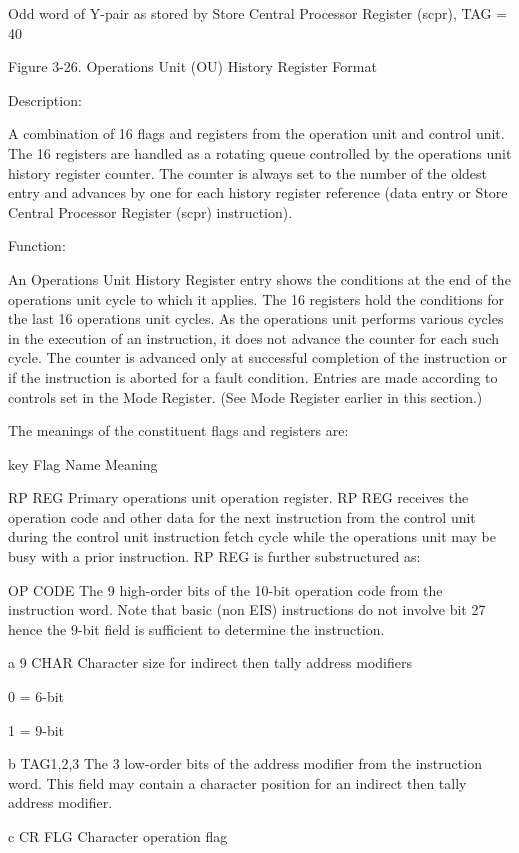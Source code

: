 Odd word of Y-pair as stored by Store Central Processor Register (scpr), TAG = 40

Figure 3-26. Operations Unit (OU) History Register Format

Description:

A combination of 16 flags and registers from the operation unit and control
unit. The 16 registers are handled as a rotating queue controlled by the
operations unit history register counter. The counter is always set to the
number of the oldest entry and advances by one for each history register
reference (data entry or Store Central Processor Register (scpr) instruction).

Function:

An Operations Unit History Register entry shows the conditions at the end of
the operations unit cycle to which it applies. The 16 registers hold the
conditions for the last 16 operations unit cycles. As the operations unit
performs various cycles in the execution of an instruction, it does not advance
the counter for each such cycle. The counter is advanced only at successful
completion of the instruction or if the instruction is aborted for a fault
condition. Entries are made according to controls set in the Mode Register.
(See Mode Register earlier in this section.)

The meanings of the constituent flags and registers are:

key Flag Name Meaning

RP REG Primary operations unit operation register. RP REG receives the
operation code and other data for the next instruction from the control unit
during the control unit instruction fetch cycle while the operations unit may
be busy with a prior instruction.  RP REG is further substructured as:

OP CODE The 9 high-order bits of the 10-bit operation code from the instruction
word. Note that basic (non EIS) instructions do not involve bit 27 hence the
9-bit field is sufficient to determine the instruction.

a 9 CHAR Character size for indirect then tally address modifiers

0 = 6-bit

1 = 9-bit

b TAG1,2,3 The 3 low-order bits of the address modifier from the instruction
word. This field may contain a character position for an indirect then tally
address modifier.

c CR FLG Character operation flag

